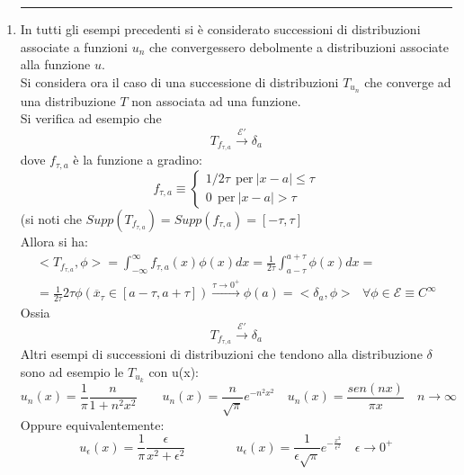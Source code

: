 \documentclass[twoside]{article}
\begin{document}
\begin{enumerate}
\begin{proof}
     \end{proof}
     
     \item
      \rule{\textwidth}{0.7pt}
     In tutti gli esempi precedenti si è considerato successioni di distribuzioni associate a funzioni $u_n$ che convergessero debolmente a distribuzioni associate alla funzione $u$.
     \\
     Si considera ora il caso di una successione di distribuzioni $T_{u_{n}}$ che converge ad una distribuzione $T$ non associata ad una funzione.
     \\
     Si verifica ad esempio che 
     \begin{equation}
         T_{f_{\tau,a}}\xrightarrow{\mathcal{E}'}\delta_a
     \end{equation}
     dove $f_{\tau,a}$ è la funzione a gradino:
     \begin{equation}
         f_{\tau,a}\equiv \left\{ \begin{array}{lr}
              1/2\tau \ \ \text{per} \ |x-a|\le \tau  \\
              0 \ \ \text{per} \ |x-a|>\tau
         \end{array}
         \right.
     \end{equation}
     (si noti che $Supp(T_{f_{\tau,a}})=Supp(f_{\tau,a})=[-\tau,\tau]$
     \\
     Allora si ha:
     \begin{equation}\begin{split}
         <T_{f_{\tau,a}},\phi>=\int_{-\infty}^{\infty} f_{\tau,a}(x)\phi(x)dx =\frac{1}{2\tau}\int_{a-\tau}^{a+\tau}\phi(x)dx= \\ =\frac{1}{2\tau}2\tau \phi(\overline{x}_{\tau}\in [a-\tau,a+\tau]) \xrightarrow{\tau \to 0^+}\phi(a)=<\delta_a,\phi> \ \ \ \forall \phi \in \mathcal{E}\equiv C^{\infty}
    \end{split} \end{equation}
     Ossia 
     \begin{equation}
         T_{f_{\tau,a}}\xrightarrow{\mathcal{E}'}\delta_a
     \end{equation}
     Altri esempi di successioni di distribuzioni che tendono alla distribuzione $\delta$ sono ad esempio le $T_{u_k}$ con u(x):
     \begin{equation}
         u_n(x)=\frac{1}{\pi}\frac{n}{1+n^2x^2} \quad \quad u_n(x)=\frac{n}{\sqrt{\pi}}e^{-n^2x^2} \quad 
         u_n(x)=\frac{sen(nx)}{\pi x} \quad n\to\infty
     \end{equation}
     Oppure equivalentemente:
     \begin{equation}
         u_\epsilon(x)=\frac{1}{\pi}\frac{\epsilon}{x^2+\epsilon^2} \qquad \qquad u_\epsilon(x)=\frac{1}{\epsilon\sqrt{\pi}}e^{-\frac{x^2}{\epsilon^2}} \quad \epsilon\to 0^+
     \end{equation}
\end{enumerate}
\end{document}
